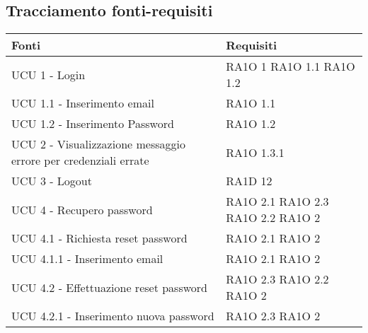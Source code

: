 \subsection{Tracciamento fonti-requisiti}
      \begin{center}
      \bgroup
      \def\arraystretch{1.8}
      \begin{longtable}{ | p{5cm} | p{5cm} |}
    
      \cellcolor[gray]{0.9} \textbf{Fonti} & \cellcolor[gray]{0.9} \textbf{Requisiti} \\ \hline       
            UCU 1 - Login &  RA1O 1 \newline  RA1O 1.1 \newline  RA1O 1.2 \newline  \\ \hline      
            UCU 1.1 - Inserimento email &  RA1O 1.1 \newline  \\ \hline      
            UCU 1.2 - Inserimento Password &  RA1O 1.2 \newline  \\ \hline      
            UCU 2 - Visualizzazione messaggio errore per credenziali errate &  RA1O 1.3.1 \newline  \\ \hline      
            UCU 3 - Logout &  RA1D 12 \newline  \\ \hline      
            UCU 4 - Recupero password &  RA1O 2.1 \newline  RA1O 2.3 \newline  RA1O 2.2 \newline  RA1O 2 \newline  \\ \hline      
            UCU 4.1 - Richiesta reset password &  RA1O 2.1 \newline  RA1O 2 \newline  \\ \hline      
            UCU 4.1.1 - Inserimento email &  RA1O 2.1 \newline  RA1O 2 \newline  \\ \hline      
            UCU 4.2 - Effettuazione reset password &  RA1O 2.3 \newline  RA1O 2.2 \newline  RA1O 2 \newline  \\ \hline      
            UCU 4.2.1 - Inserimento nuova password &  RA1O 2.3 \newline  RA1O 2 \newline  \\ \hline      

\end{longtable}
\end{center}
